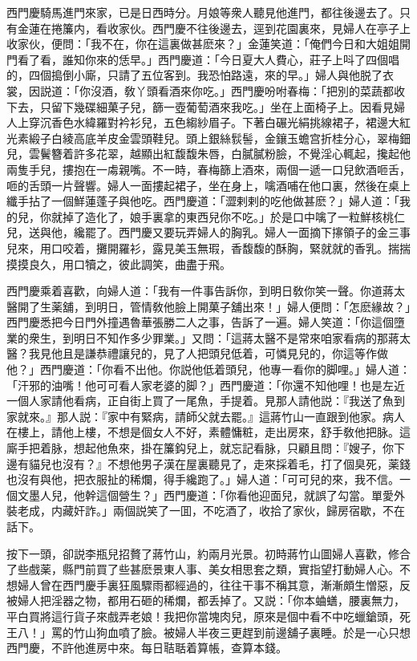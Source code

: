 西門慶騎馬進門來家，已是日西時分。月娘等衆人聽見他進門，都往後邊去了。只有金蓮在捲簾内，看收家伙。西門慶不往後邊去，逕到花園裏來，見婦人在亭子上收家伙，便問：「我不在，你在這裏做甚麽來？」金蓮笑道：「俺們今日和大姐姐開門看了看，誰知你來的恁早。」西門慶道：「今日夏大人費心，莊子上呌了四個唱的，四個搗倒小廝，只請了五位客到。我恐怕路遠，來的早。」婦人與他脱了衣裳，因説道：「你沒酒，敎丫頭看酒來你吃。」西門慶吩咐春梅：「把別的菜蔬都收下去，只留下幾碟細菓子兒，篩一壺葡萄酒來我吃。」坐在上面椅子上。因看見婦人上穿沉香色水緯羅對衿衫兒，五色縐紗眉子。下著白碾光絹挑線裙子，裙邊大紅光素緞子白綾高底羊皮金雲頭鞋兒。頭上銀絲䯼髻，金鑲玉蟾宫折桂分心，翠梅鈿兒，雲鬢簪着許多花翠，越顯出紅馥馥朱唇，白膩膩粉臉，不覺淫心輒起，攙起他兩隻手兒，摟抱在一䖏親嘴。不一時，春梅篩上酒來，兩個一遞一口兒飲酒咂舌，咂的舌頭一片聲響。婦人一面摟起裙子，坐在身上，噙酒哺在他口裏，然後在桌上纖手拈了一個鮮蓮蓬子與他吃。西門慶道：「澀剌剌的吃他做甚麽？」婦人道：「我的兒，你就掉了造化了，娘手裏拿的東西兒你不吃。」於是口中噙了一粒鮮核桃仁兒，送與他，纔罷了。西門慶又要玩弄婦人的胸乳。婦人一面摘下㩟領子的金三事兒來，用口咬着，攤開羅衫，露見美玉無瑕，香馥馥的酥胸，緊就就的香乳。揣揣摸摸良久，用口犢之，彼此調笑，曲盡于飛。

西門慶乘着喜歡，向婦人道：「我有一件事告訴你，到明日敎你笑一聲。你道蔣太醫開了生薬舖，到明日，管情敎他臉上開菓子舖出來！」婦人便問：「怎麽緣故？」西門慶悉把今日門外撞遇魯華張勝二人之事，告訴了一遍。婦人笑道：「你這個墮業的衆生，到明日不知作多少罪業。」又問：「這蔣太醫不是常來咱家看病的那蔣太醫？我見他且是謙恭禮讓兒的，見了人把頭兒低着，可憐見兒的，你這等作做他？」西門慶道：「你看不出他。你説他低着頭兒，他專一看你的脚哩。」婦人道：「汗邪的油嘴！他可可看人家老婆的脚？」西門慶道：「你還不知他哩！也是左近一個人家請他看病，正自街上買了一尾魚，手提着。見那人請他説：『我送了魚到家就來。』那人説：『家中有緊病，請師父就去罷。』這蔣竹山一直跟到他家。病人在樓上，請他上樓，不想是個女人不好，素體慵粧，走出房來，舒手敎他把脉。這廝手把着脉，想起他魚來，掛在簾鈎兒上，就忘記看脉，只顧且問：『嫂子，你下邊有貓兒也沒有？』不想他男子漢在屋裏聽見了，走來採着毛，打了個臭死，薬錢也沒有與他，把衣服扯的稀爛，得手纔跑了。」婦人道：「可可兒的來，我不信。一個文墨人兒，他幹這個營生？」西門慶道：「你看他迎面兒，就誤了勾當。單愛外裝老成，内藏奸詐。」兩個説笑了一囬，不吃酒了，收拾了家伙，歸房宿歇，不在話下。

按下一頭，卻説李瓶兒招贅了蔣竹山，約兩月光景。初時蔣竹山圖婦人喜歡，修合了些戲薬，縣門前買了些甚麽景東人事、美女相思套之類，實指望打動婦人心。不想婦人曾在西門慶手裏狂風驟雨都經過的，往往干事不稱其意，漸漸頗生憎惡，反被婦人把淫器之物，都用石砸的稀爛，都丢掉了。又説：「你本蛐蟮，腰裏無力，平白買將這行貨子來戲弄老娘！我把你當塊肉兒，原來是個中看不中吃蠟鎗頭，死王八！」罵的竹山狗血噴了臉。被婦人半夜三更趕到前邊舖子裏睡。於是一心只想西門慶，不許他進房中來。每日聐聒着算帳，查算本錢。

